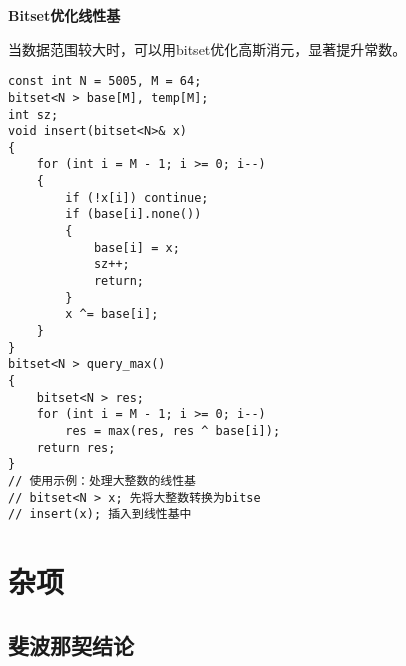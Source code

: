 \documentclass[a4paper, fontset=none]{ctexart}
\begin{document}
\textbf{Bitset优化线性基}

当数据范围较大时，可以用bitset优化高斯消元，显著提升常数。

\begin{verbatim}
const int N = 5005, M = 64;
bitset<N > base[M], temp[M];
int sz;
void insert(bitset<N>& x)
{
    for (int i = M - 1; i >= 0; i--)
    {
        if (!x[i]) continue;
        if (base[i].none())
        {
            base[i] = x;
            sz++;
            return;
        }
        x ^= base[i];
    }
}
bitset<N > query_max()
{
    bitset<N > res;
    for (int i = M - 1; i >= 0; i--)
        res = max(res, res ^ base[i]);
    return res;
}
// 使用示例：处理大整数的线性基
// bitset<N > x; 先将大整数转换为bitse
// insert(x); 插入到线性基中
\end{verbatim}

\section{杂项}
\subsection{斐波那契结论}
\end{document}
